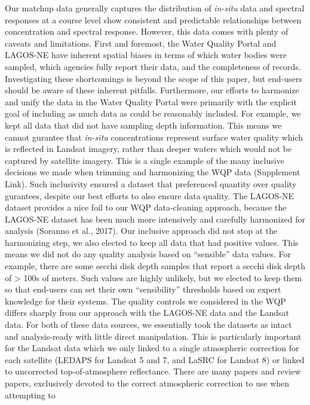\documentclass[]{article}
\begin{document}
Our matchup data generally captures the distribution of \emph{in-situ}
data and spectral responses at a course level show consistent and
predictable relationships between concentration and spectral response.
However, this data comes with plenty of caveats and limitations. First
and foremost, the Water Quality Portal and LAGOS-NE have inherent
spatial biases in terms of which water bodies were sampled, which
agencies fully report their data, and the completeness of records.
Investigating these shortcomings is beyond the scope of this paper, but
end-users should be aware of these inherent pitfalls. Furthermore, our
efforts to harmonize and unify the data in the Water Quality Portal were
primarily with the explicit goal of including as much data as could be
reasonably included. For example, we kept all data that did not have
sampling depth information. This means we cannot gurantee that
\emph{in-situ} concentrations represent surface water quality which is
reflected in Landsat imagery, rather than deeper waters which would not
be captured by satellite imagery. This is a single example of the many
inclusive decisions we made when trimming and harmonizing the WQP data
(Supplement Link). Such inclusivity ensured a dataset that preferenced
quantity over quality gurantees, despite our best efforts to also ensure
data quality. The LAGOS-NE dataset provides a nice foil to our WQP
data-cleaning approach, because the LAGOS-NE dataset has been much more
intensively and carefully harmonized for analysis (Soranno et al.,
2017). Our inclusive approach did not stop at the harmonizing step, we
also elected to keep all data that had positive values. This means we
did not do any quality analysis based on ``sensible'' data values. For
example, there are some secchi disk depth samples that report a secchi
disk depth of \textgreater{} 100s of meters. Such values are highly
unlikely, but we elected to keep them so that end-users can set their
own ``sensibility'' thresholds based on expert knowledge for their
systems. The quality controls we considered in the WQP differs sharply
from our approach with the LAGOS-NE data and the Landsat data. For both
of these data sources, we essentially took the datasets as intact and
analysis-ready with little direct manipulation. This is particularly
important for the Landsat data which we only linked to a single
atmospheric correction for each satellite (LEDAPS for Landsat 5 and 7,
and LaSRC for Landsat 8) or linked to uncorrected top-of-atmosphere
reflectance. There are many papers and review papers, exclusively
devoted to the correct atmospheric correction to use when attempting to
\end{document}
